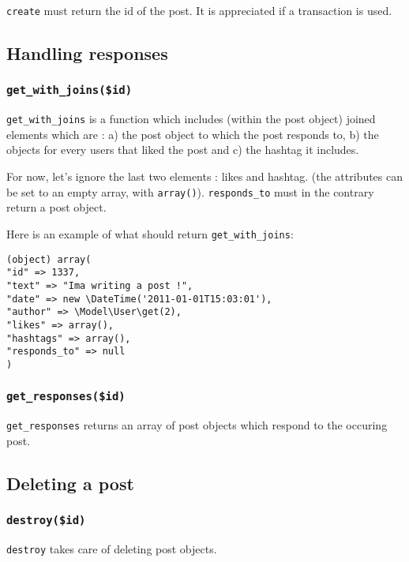 \documentclass[twoside,a4paper,12pt]{article}
\begin{document}
\texttt{create} must return the id of the post. It is appreciated if a transaction is used.

\subsection{Handling responses}

\subsubsection{\texttt{get\_with\_joins(\$id)}}

\texttt{get\_with\_joins} is a function which includes (within the post object) joined elements which are : a) the post object to which the post responds to, b) the objects for every users that liked the post and c) the hashtag it includes.

For now, let's ignore the last two elements : likes and hashtag. (the attributes can be set to an empty array, with \texttt{array()}). \texttt{responds\_to} must in the contrary return a post object.

Here is an example of what should return \texttt{get\_with\_joins}:

\begin{lstlisting}
(object) array(
"id" => 1337,
"text" => "Ima writing a post !",
"date" => new \DateTime('2011-01-01T15:03:01'),
"author" => \Model\User\get(2),
"likes" => array(),
"hashtags" => array(),
"responds_to" => null
)

\end{lstlisting}


\subsubsection{\texttt{get\_responses(\$id)}}

\texttt{get\_responses} returns an array of post objects which respond to the occuring post.

\subsection{Deleting a post}

\subsubsection{\texttt{destroy(\$id)}}

\texttt{destroy} takes care of deleting post objects.
\end{document}
